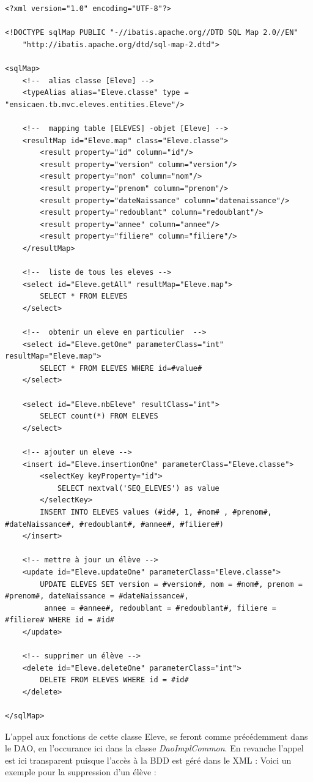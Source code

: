 \documentclass[a4paper,12pt]{article}
\begin{document}
\begin{lstlisting}
<?xml version="1.0" encoding="UTF-8"?>

<!DOCTYPE sqlMap PUBLIC "-//ibatis.apache.org//DTD SQL Map 2.0//EN"
	"http://ibatis.apache.org/dtd/sql-map-2.dtd">
	
<sqlMap>
	<!--  alias classe [Eleve] -->
	<typeAlias alias="Eleve.classe" type = "ensicaen.tb.mvc.eleves.entities.Eleve"/>
	
	<!--  mapping table [ELEVES] -objet [Eleve] -->
	<resultMap id="Eleve.map" class="Eleve.classe">
		<result property="id" column="id"/>
		<result property="version" column="version"/>
		<result property="nom" column="nom"/>
		<result property="prenom" column="prenom"/>
		<result property="dateNaissance" column="datenaissance"/>
		<result property="redoublant" column="redoublant"/>
		<result property="annee" column="annee"/>
		<result property="filiere" column="filiere"/>		
	</resultMap>
	
	<!--  liste de tous les eleves -->
	<select id="Eleve.getAll" resultMap="Eleve.map">
		SELECT * FROM ELEVES
	</select>
	
	<!--  obtenir un eleve en particulier  -->
	<select id="Eleve.getOne" parameterClass="int" resultMap="Eleve.map">
		SELECT * FROM ELEVES WHERE id=#value#
	</select>
	
	<select id="Eleve.nbEleve" resultClass="int">
		SELECT count(*) FROM ELEVES
	</select>
	
	<!-- ajouter un eleve -->
	<insert id="Eleve.insertionOne" parameterClass="Eleve.classe">
		<selectKey keyProperty="id">
			SELECT nextval('SEQ_ELEVES') as value
		</selectKey>
		INSERT INTO ELEVES values (#id#, 1, #nom# , #prenom#, #dateNaissance#, #redoublant#, #annee#, #filiere#)
	</insert>
	
	<!-- mettre à jour un élève -->
	<update id="Eleve.updateOne" parameterClass="Eleve.classe">
		UPDATE ELEVES SET version = #version#, nom = #nom#, prenom = #prenom#, dateNaissance = #dateNaissance#,
		 annee = #annee#, redoublant = #redoublant#, filiere = #filiere# WHERE id = #id#
	</update>
	
	<!-- supprimer un élève -->
	<delete id="Eleve.deleteOne" parameterClass="int">
		DELETE FROM ELEVES WHERE id = #id#
	</delete>

</sqlMap>
\end{lstlisting}

L'appel aux fonctions de cette classe Eleve, se feront comme précédemment dans le DAO, en l'occurance ici dans la classe \textit{DaoImplCommon}.
En revanche l'appel est ici transparent puisque l'accès à la BDD est géré dans le XML :
Voici un exemple pour la suppression d'un élève :
\end{document}
